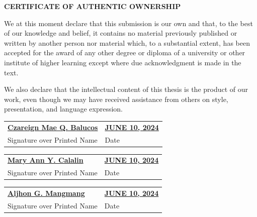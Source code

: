 {\baselineskip}




\begin{center}
\textbf{CERTIFICATE OF AUTHENTIC OWNERSHIP}
\end{center}

\vspace{.5cm}

\noindent We at this moment declare that this submission is our own and that, to the best of our knowledge and belief, it contains no material previously published or written by another person nor material which, to a substantial extent, has been accepted for the award of any other degree or diploma of a university or other institute of higher learning except where due acknowledgment is made in the text.

\vspace{0.5cm}

\noindent We also declare that the intellectual content of this thesis is the product of our work, even though we may have received assistance from others on style, presentation, and language expression.

\vspace{1cm}


\noindent
\begin{tabular}{p{} p{}}
\underline{\textbf{Czareign Mae Q. Balucos}} & \hfill \underline{\textbf{JUNE 10, 2024}} \\
Signature over Printed Name & \hfill Date \\
\end{tabular}

\vspace{1.2cm}

\noindent
\begin{tabular}{p{} p{}}
\underline{\textbf{Mary Ann Y. Calalin}} & \hfill \underline{\textbf{JUNE 10, 2024}} \\
Signature over Printed Name & \hfill Date \\
\end{tabular}

\vspace{1.2cm}

\noindent
\begin{tabular}{p{} p{}}
\underline{\textbf{Aljhon G. Mangmang}} & \hfill \underline{\textbf{JUNE 10, 2024}} \\
Signature over Printed Name & \hfill Date \\
\end{tabular}

